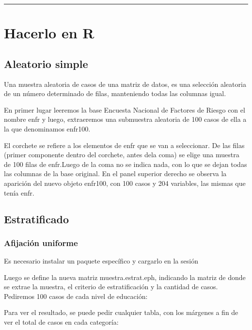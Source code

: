 \documentclass[]{book}
\begin{document}
\begin{center}\rule{0.5\linewidth}{\linethickness}\end{center}

\hypertarget{hacerlo-en-r-4}{%
\section{Hacerlo en R}\label{hacerlo-en-r-4}}

\hypertarget{aleatorio-simple}{%
\subsection{Aleatorio simple}\label{aleatorio-simple}}

Una muestra aleatoria de casos de una matriz de datos, es una selección aleatoria de un número determinado de filas, manteniendo todas las columnas igual.

En primer lugar leeremos la base Encuesta Nacional de Factores de Riesgo con el nombre enfr y luego, extraeremos una submuestra aleatoria de 100 casos de ella a la que denominamos enfr100.

El corchete se refiere a los elementos de enfr que se van a seleccionar. De las filas (primer componente dentro del corchete, antes dela coma) se elige una muestra de 100 filas de enfr.Luego de la coma no se indica nada, con lo que se dejan todas las columnas de la base original. En el panel superior derecho se observa la aparición del nuevo objeto enfr100, con 100 casos y 204 variables, las mismas que tenía enfr.

\hypertarget{estratificado}{%
\subsection{Estratificado}\label{estratificado}}

\hypertarget{afijaciuxf3n-uniforme}{%
\subsubsection{Afijación uniforme}\label{afijaciuxf3n-uniforme}}

Es necesario instalar un paquete específico y cargarlo en la sesión

Luego se define la nueva matriz muestra.estrat.eph, indicando la matriz de donde se extrae la muestra, el criterio de estratificación y la cantidad de casos. Pediremos 100 casos de cada nivel de educación:

Para ver el resultado, se puede pedir cualquier tabla, con los márgenes a fin de ver el total de casos en cada categoría:
\end{document}
